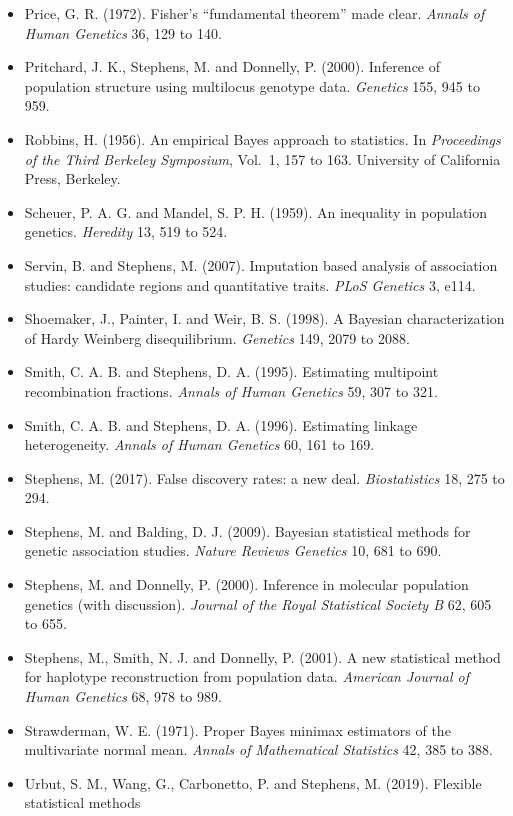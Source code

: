 \begin{itemize}
\emph{American Mathematical Monthly} 66, 673 to 683.
\item Price, G. R. (1972). Fisher's ``fundamental theorem'' made clear.
\emph{Annals of Human Genetics} 36, 129 to 140.
\item Pritchard, J. K., Stephens, M. and Donnelly, P. (2000). Inference of population structure
using multilocus genotype data. \emph{Genetics} 155, 945 to 959.
\item Robbins, H. (1956). An empirical Bayes approach to statistics. In \emph{Proceedings of the
Third Berkeley Symposium}, Vol.\ 1, 157 to 163. University of California Press, Berkeley.
\item Scheuer, P. A. G. and Mandel, S. P. H. (1959). An inequality in population genetics.
\emph{Heredity} 13, 519 to 524.
\item Servin, B. and Stephens, M. (2007). Imputation based analysis of association studies:
candidate regions and quantitative traits. \emph{PLoS Genetics} 3, e114.
\item Shoemaker, J., Painter, I. and Weir, B. S. (1998). A Bayesian characterization of
Hardy Weinberg disequilibrium. \emph{Genetics} 149, 2079 to 2088.
\item Smith, C. A. B. and Stephens, D. A. (1995). Estimating multipoint recombination fractions.
\emph{Annals of Human Genetics} 59, 307 to 321.
\item Smith, C. A. B. and Stephens, D. A. (1996). Estimating linkage heterogeneity.
\emph{Annals of Human Genetics} 60, 161 to 169.
\item Stephens, M. (2017). False discovery rates: a new deal. \emph{Biostatistics} 18, 275 to 294.
\item Stephens, M. and Balding, D. J. (2009). Bayesian statistical methods for genetic association
studies. \emph{Nature Reviews Genetics} 10, 681 to 690.
\item Stephens, M. and Donnelly, P. (2000). Inference in molecular population genetics (with
discussion). \emph{Journal of the Royal Statistical Society B} 62, 605 to 655.
\item Stephens, M., Smith, N. J. and Donnelly, P. (2001). A new statistical method for haplotype
reconstruction from population data. \emph{American Journal of Human Genetics} 68, 978 to 989.
\item Strawderman, W. E. (1971). Proper Bayes minimax estimators of the multivariate normal mean.
\emph{Annals of Mathematical Statistics} 42, 385 to 388.
\item Urbut, S. M., Wang, G., Carbonetto, P. and Stephens, M. (2019). Flexible statistical methods

\end{itemize}

